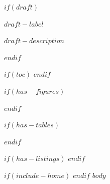\documentclass[11pt,a4paper,twoside,openright]{book}
\begin{document}
$if(draft)$
\thispagestyle{empty}
\vspace*{0.3\textheight}
\begin{center}
  {\Huge\bfseries\sffamily\color{ManualPrimary}$draft-label$}\par
  \vspace{1em}
  {\large\sffamily $draft-description$}
\end{center}
\clearpage
$endif$

$if(toc)$
\tableofcontents
\label{manual:toc-end}
\clearpage
$endif$

$if(has-figures)$
\listoffigures
\clearpage
$endif$

$if(has-tables)$
\listoftables
\clearpage
$endif$

$if(has-listings)$
\lstlistoflistings
\clearpage
$endif$

\mainmatter
$if(include-home)$
\setcounter{chapter}{-1}
$endif$
\makeatletter
\let\ManualOriginalStarredChapter\@schapter
\renewcommand{\@schapter}[1]{%
  \markboth{\MakeUppercase{#1}}{}%
  \ManualOriginalStarredChapter{#1}%
}
\makeatother
$body$
\end{document}
